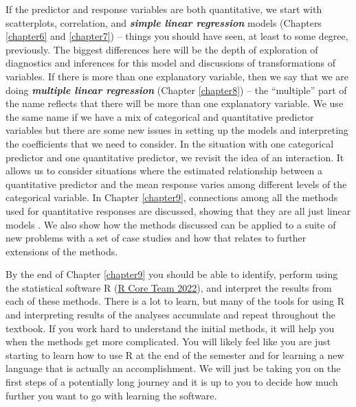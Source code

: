 \documentclass[
]{book}
\begin{document}
\indent If the predictor and response variables are both quantitative, we start with
scatterplots, correlation,
and \textbf{\emph{simple linear regression}} models (Chapters \ref{chapter6} and
\ref{chapter7}) -- things you should have seen, at least to some degree,
previously. The biggest differences here will be
the depth of exploration of diagnostics and inferences for this model and
discussions of transformations of variables.  If there is more than one
explanatory variable, then we say that we are doing \textbf{\emph{multiple linear regression}}
(Chapter \ref{chapter8}) -- the ``multiple'' part of the name reflects that there will
be more
than one explanatory variable. We use the same name if we have a mix of
categorical and quantitative predictor variables but there are some new issues
in setting up the models and interpreting the coefficients that we need to
consider. In the situation with one categorical predictor and one quantitative
predictor, we revisit the idea of an interaction.
It allows us to consider situations
where the estimated relationship between a quantitative predictor and the
mean response
varies among different levels of the categorical variable. In Chapter \ref{chapter9}, connections among all the methods used for quantitative responses are discussed, showing that they are all just linear models . We also show how the methods discussed can be applied to a suite of new problems with a set of case studies and how that relates to further extensions of the methods.

\indent By the end of Chapter \ref{chapter9} you should be able to identify, perform
using the statistical software R (\protect\hyperlink{ref-R-base}{R Core Team 2022}), and interpret the results from each of these methods. There
is a lot to learn, but many of the tools for using R and interpreting results
of the analyses accumulate and repeat throughout the textbook. If you work hard to
understand the initial methods, it will help you when the methods get more
complicated. You will likely feel like you are just starting to learn how to
use R at the end of the semester and for learning a new language that is
actually an accomplishment. We will just be taking you on the first steps of a
potentially long journey and it is up to you to decide how much further you
want to go with learning the software.
\end{document}

